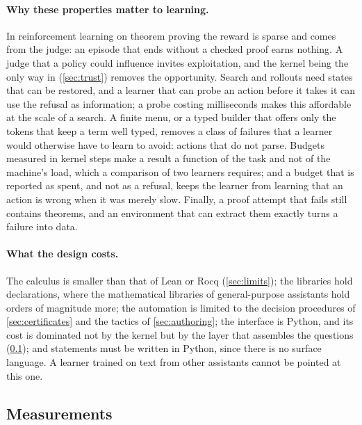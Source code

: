 \paragraph{Why these properties matter to learning.}
In reinforcement learning on theorem proving the reward is sparse and comes from the judge: an episode that ends without a checked proof earns nothing.
A judge that a policy could influence invites exploitation, and the kernel being the only way in (\cref{sec:trust}) removes the opportunity.
Search and rollouts need states that can be restored, and a learner that can probe an action before it takes it can use the refusal as information; a probe costing milliseconds makes this affordable at the scale of a search.
A finite menu, or a typed builder that offers only the tokens that keep a term well typed, removes a class of failures that a learner would otherwise have to learn to avoid: actions that do not parse.
Budgets measured in kernel steps make a result a function of the task and not of the machine's load, which a comparison of two learners requires; and a budget that is reported as spent, and not as a refusal, keeps the learner from learning that an action is wrong when it was merely slow.
Finally, a proof attempt that fails still contains theorems, and an environment that can extract them exactly turns a failure into data.

\paragraph{What the design costs.}
The calculus is smaller than that of Lean or Rocq (\cref{sec:limits}); the libraries hold \libGlobals{} declarations, where the mathematical libraries of general-purpose assistants hold orders of magnitude more; the automation is limited to the decision procedures of \cref{sec:certificates} and the tactics of \cref{sec:authoring}; the interface is Python, and its cost is dominated not by the kernel but by the layer that assembles the questions (\cref{sec:measure}); and statements must be written in Python, since there is no surface language.
A learner trained on text from other assistants cannot be pointed at this one.

\subsection{Measurements}\label{sec:measure}


